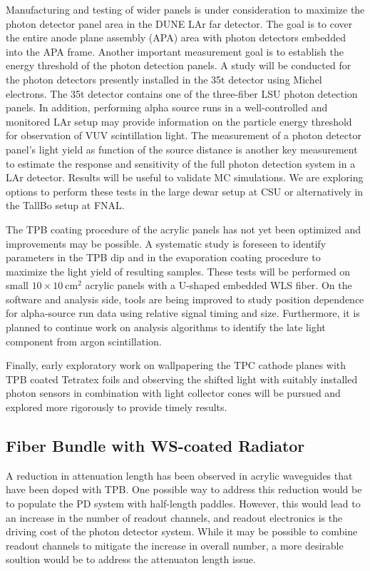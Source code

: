 Manufacturing and testing of wider panels is under consideration to
maximize the photon detector panel area in the DUNE LAr far
detector. The goal is to cover the entire anode plane assembly (APA)
area with photon detectors embedded into the APA frame.  Another
important measurement goal is to establish the energy threshold of the
photon detection panels. A study will be conducted for the photon
detectors presently installed in the 35t detector  using Michel
electrons. The 35t detector contains one of the three-fiber LSU photon
detection panels. In addition, performing alpha source runs in a well-controlled
and monitored LAr setup may provide information on the particle energy
threshold for observation of VUV scintillation light.  The measurement
of a photon detector panel's light yield as function of the source
distance is another key measurement to estimate the response and
sensitivity of the full photon detection system in a LAr
detector. Results will be useful to validate MC simulations.  We are
exploring options to perform these tests in the large dewar setup at
CSU or alternatively in the TallBo setup  at FNAL.

The TPB coating procedure of the acrylic panels has not yet been
optimized and improvements may be possible. A systematic
study is foreseen to identify parameters in the TPB dip and %
in the
evaporation coating procedure to maximize the light yield of resulting
samples. These tests will be performed on small
$10\times10~\mathrm{cm}^2$ acrylic panels with a U-shaped embedded WLS
fiber.  On the software and analysis side, %
tools are being improved to study position dependence for alpha-source run
data using relative signal timing and size. Furthermore, it is planned to
continue work on analysis algorithms to identify the late light
component from argon scintillation.

Finally, early exploratory work on wallpapering the TPC cathode planes
with TPB coated Tetratex foils and observing the shifted light with
suitably installed photon sensors in combination with light collector
cones will be pursued and explored more rigorously to provide timely
results.


\subsection{Fiber Bundle with WS-coated Radiator}

A reduction in attenuation length has been observed in
acrylic waveguides that have been doped with TPB. One possible way to
address this reduction would be to populate the PD system with half-length
paddles. However, this would lead to an increase in the number of readout
channels, and readout
electronics is the driving cost of the photon detector system. While it may be possible to combine readout channels to
mitigate the increase in overall number, a more desirable soultion
would be to address the attenuaton length issue.   

